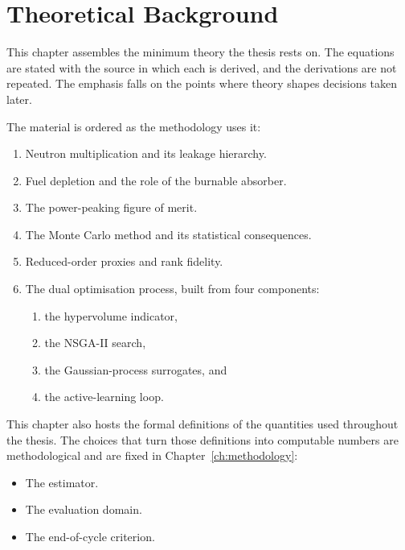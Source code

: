 \providecommand{\openpoint}[1]{\par\noindent\fbox{\parbox{0.97\linewidth}{%
  \textbf{Open point:} #1}}\par}

\chapter{Theoretical Background}
\label{ch:background}

This chapter assembles the minimum theory the thesis rests on. The
equations are stated with the source in which each is derived, and the
derivations are not repeated. The emphasis falls on the points where
theory shapes decisions taken later.

The material is ordered as the methodology uses it:

\begin{enumerate}
  \item Neutron multiplication and its leakage hierarchy.
  \item Fuel depletion and the role of the burnable absorber.
  \item The power-peaking figure of merit.
  \item The Monte Carlo method and its statistical consequences.
  \item Reduced-order proxies and rank fidelity.
  \item The dual optimisation process, built from four components:
  \begin{enumerate}
    \item the hypervolume indicator,
    \item the NSGA-II search,
    \item the Gaussian-process surrogates, and
    \item the active-learning loop.
  \end{enumerate}
\end{enumerate}

This chapter also hosts the formal definitions of the quantities used
throughout the thesis. The choices that turn those definitions into
computable numbers are methodological and are fixed in
Chapter~\ref{ch:methodology}:

\begin{itemize}
  \item The estimator.
  \item The evaluation domain.
  \item The end-of-cycle criterion.
\end{itemize}

